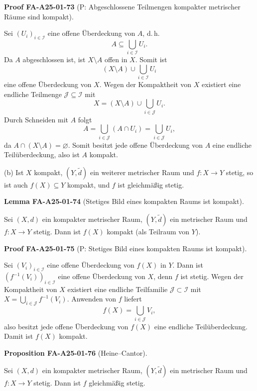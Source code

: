 \documentclass[10pt, letterpaper]{article}
\newcommand{\CustomHeading}[3]{%
  \par\medskip\noindent%
  \textbf{#1 #2} \textnormal{(#3)}.\enskip%
}
\newenvironment{PROP}[2]{\begin{unitbox}\CustomHeading{Proposition}{#1}{#2}}{\end{unitbox}}
\newenvironment{LEM}[2]{\begin{unitbox}\CustomHeading{Lemma}{#1}{#2}}{\end{unitbox}}
\newenvironment{PROOF}[2]{\begin{unitbox}\CustomHeading{Proof}{#1}{#2}}{\end{unitbox}}
\begin{document}
\begin{PROOF}{FA-A25-01-73}{P: Abgeschlossene Teilmengen kompakter metrischer Räume sind kompakt}
Sei $(U_i)_{i \in \mathcal{I}}$ eine offene Überdeckung von $A$, d.\,h.
\[
A \subseteq \bigcup_{i \in \mathcal{I}} U_i.
\]
Da $A$ abgeschlossen ist, ist $X \setminus A$ offen in $X$. Somit ist
\[
(X \setminus A) \cup \bigcup_{i \in \mathcal{I}} U_i
\]
eine offene Überdeckung von $X$. Wegen der Kompaktheit von $X$ existiert eine endliche Teilmenge $\mathcal{J} \subseteq \mathcal{I}$ mit
\[
X = (X \setminus A) \cup \bigcup_{i \in \mathcal{J}} U_i.
\]
Durch Schneiden mit $A$ folgt
\[
A = \bigcup_{i \in \mathcal{J}} (A \cap U_i) = \bigcup_{i \in \mathcal{J}} U_i,
\]
da $A \cap (X \setminus A) = \varnothing$. Somit besitzt jede offene Überdeckung von $A$ eine endliche Teilüberdeckung, also ist $A$ kompakt.
\end{PROOF}




(b) Ist $X$ kompakt, $(Y, \tilde{d})$ ein weiterer metrischer Raum und $f: X \rightarrow Y$ stetig, so ist auch $f(X) \subseteq Y$ kompakt, und $f$ ist gleichmäßig stetig.



\begin{LEM}{FA-A25-01-74}{Stetiges Bild eines kompakten Raums ist kompakt}
Sei $(X,d)$ ein kompakter metrischer Raum, $(Y,\tilde d)$ ein metrischer Raum und
$f:X\to Y$ stetig. Dann ist $f(X)$ kompakt (als Teilraum von $Y$).
\end{LEM}




\begin{PROOF}{FA-A25-01-75}{P: Stetiges Bild eines kompakten Raums ist kompakt}
Sei $(V_i)_{i\in\mathcal I}$ eine offene Überdeckung von $f(X)$ in $Y$. Dann ist
$(f^{-1}(V_i))_{i\in\mathcal I}$ eine offene Überdeckung von $X$, denn $f$ ist stetig.
Wegen der Kompaktheit von $X$ existiert eine endliche Teilfamilie $\mathcal J\subset\mathcal I$
mit $X=\bigcup_{i\in\mathcal J} f^{-1}(V_i)$. Anwenden von $f$ liefert
\[
f(X)=\bigcup_{i\in\mathcal J} V_i,
\]
also besitzt jede offene Überdeckung von $f(X)$ eine endliche Teilüberdeckung. Damit ist
$f(X)$ kompakt.
\end{PROOF}





\begin{PROP}{FA-A25-01-76}{Heine--Cantor}
Sei $(X,d)$ ein kompakter metrischer Raum, $(Y,\tilde d)$ ein metrischer Raum und
$f:X\to Y$ stetig. Dann ist $f$ gleichmäßig stetig.
\end{PROP}
\end{document}
